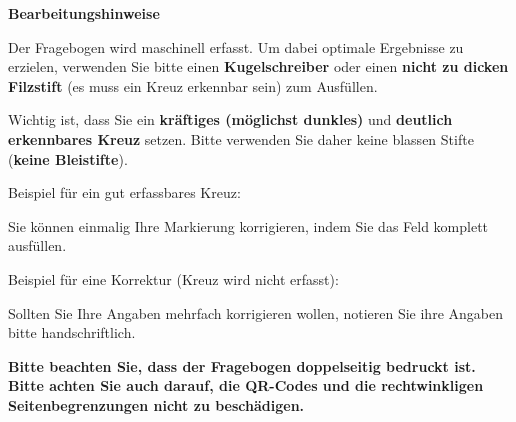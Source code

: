 \vspace{.75cm}

\begin{info}
\vspace{.5em}

\textbf{\Large Bearbeitungshinweise}

Der Fragebogen wird maschinell erfasst. Um dabei optimale Ergebnisse zu erzielen, verwenden Sie bitte einen \textbf{Kugelschreiber} oder einen \textbf{nicht zu dicken Filzstift} (es muss ein Kreuz erkennbar sein) zum Ausfüllen.

\vspace{.5em}

Wichtig ist, dass Sie ein \textbf{kräftiges (möglichst dunkles)} und \textbf{deutlich erkennbares Kreuz} setzen. Bitte verwenden Sie daher keine blassen Stifte (\textbf{keine Bleistifte}).

\vspace{.5em}

Beispiel für ein gut erfassbares Kreuz: {\LARGE \checkedbox{}}

\vspace{.5em}

Sie können einmalig Ihre Markierung korrigieren, indem Sie das Feld komplett ausfüllen.

\vspace{.5em}

Beispiel für eine Korrektur (Kreuz wird nicht erfasst): {\LARGE \correctedbox{}}

\vspace{.5em}

Sollten Sie Ihre Angaben mehrfach korrigieren wollen, notieren Sie ihre Angaben bitte handschriftlich.

\vspace{.5em}

\textbf{Bitte beachten Sie, dass der Fragebogen doppelseitig bedruckt ist. Bitte achten Sie auch darauf, die QR-Codes und die rechtwinkligen Seitenbegrenzungen nicht zu beschädigen.}

\end{info}
